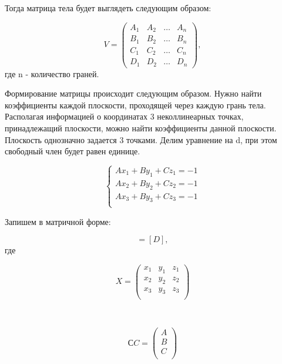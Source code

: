 Тогда матрица тела будет выглядеть следующим образом:

\begin{equation}
	V = \left(
	\begin{array}{cccc}
			A_{1} & A_{2} & \ldots & A_{n} \\
			B_{1} & B_{2} & \ldots & B_{n} \\
			C_{1} & C_{2} & \ldots & C_{n} \\
			D_{1} & D_{2} & \ldots & D_{n}
		\end{array}
	\right),
	\label{ref:f_matrix}
\end{equation}
где n - количество граней.

Формирование матрицы происходит следующим образом.
Нужно найти коэффициенты каждой плоскости, проходящей через каждую грань тела. Располагая информацией о координатах 3 неколлинеарных точках, принадлежащий плоскости, можно найти коэффициенты данной плоскости. Плоскость однозначно задается 3 точками. Делим уравнение на d, при этом свободный член будет равен единице.

\begin{equation}
	{\begin{cases}
			Ax_1 + By_1 + Cz_1 = -1 \\
			Ax_2 + By_2 + Cz_2 = -1 \\
			Ax_3 + By_3 + Cz_3 = -1 \\
		\end{cases}}
\end{equation}

Запишем в матричной форме:

\begin{equation}
	[X][C] = [D],
	\label{eq:ref1}
\end{equation}
где

\begin{equation}
	X = \left(
	\begin{array}{cccc}
			x_{1} & y_{1} & z_{1} \\
			x_{2} & y_{2} & z_{2} \\
			x_{3} & y_{3} & z_{3} \\
		\end{array}
	\right)
\end{equation}

~

\begin{equation}
	СC = \left(
	\begin{array}{c}
			A \\
			B \\
			C \\
		\end{array}
	\right)
\end{equation}

